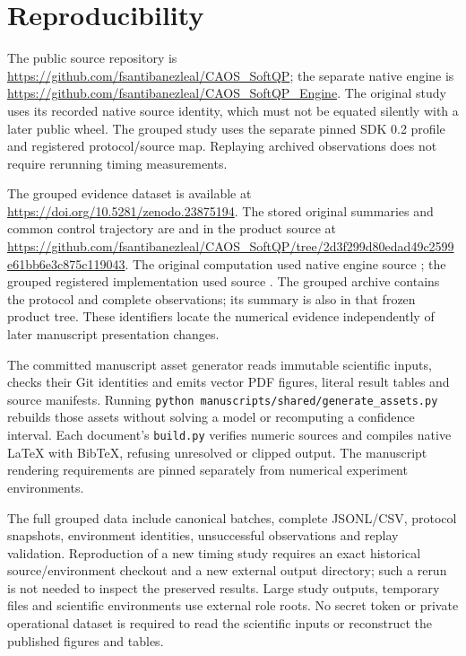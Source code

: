 \section{Reproducibility}\label{sec:reproducibility}
The public source repository is
\url{https://github.com/fsantibanezleal/CAOS_SoftQP}; the separate native engine
is \url{https://github.com/fsantibanezleal/CAOS_SoftQP_Engine}.
The original study uses its recorded native source identity, which must not
be equated silently with a later public wheel. The grouped study uses the
separate pinned SDK 0.2 profile and registered protocol/source map. Replaying
archived observations does not require rerunning timing measurements.

The grouped evidence dataset is available at
\url{https://doi.org/10.5281/zenodo.23875194}. The stored original summaries %
and common control trajectory are  %
and  in the product source at
\url{https://github.com/fsantibanezleal/CAOS_SoftQP/tree/2d3f299d80edad49c2599e61bb6e3c875c119043}.
The original computation used native engine source
; the grouped registered
implementation used source .
The grouped archive contains the protocol and complete observations; its
summary is also 
in that frozen product tree. These identifiers locate the numerical evidence
independently of later manuscript presentation changes.

The committed manuscript asset generator reads immutable scientific inputs,
checks their Git identities and emits vector PDF figures, literal result
tables and source manifests. Running
\texttt{python manuscripts/shared/generate\_assets.py} rebuilds those assets
without solving a model or recomputing a confidence interval. Each document's
\texttt{build.py} verifies numeric sources and compiles native LaTeX with
BibTeX, refusing unresolved or clipped output. The manuscript rendering
requirements are pinned separately from numerical experiment environments.

The full grouped data include canonical batches, complete JSONL/CSV,
protocol snapshots, environment identities, unsuccessful observations and
replay validation. Reproduction of a new timing study requires an exact
historical source/environment checkout and a new external output directory;
such a rerun is not needed to inspect the preserved results. Large study
outputs, temporary files and scientific environments use external role
roots. No secret token or private operational dataset is required to read
the scientific inputs or reconstruct the published figures and tables.

